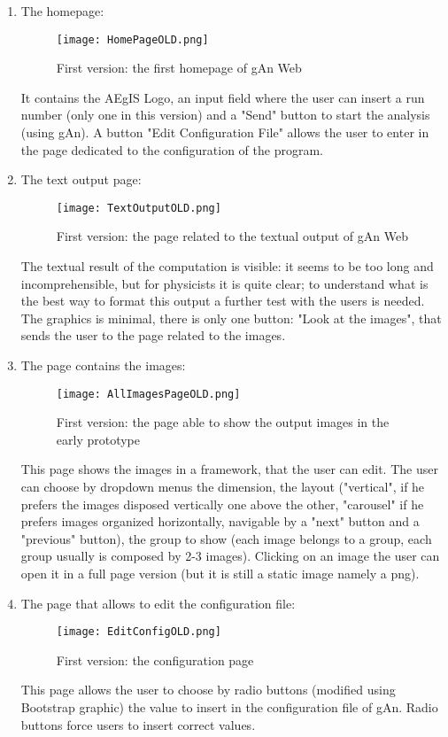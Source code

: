 \begin{enumerate}
\item The homepage:

\begin{figure}[H]
\centering
\texttt{[image: HomePageOLD.png]} 
\caption{First version: the first homepage of gAn Web}
\end{figure}

It contains the AEgIS Logo, an input field where the user can insert a run number (only one in this version) and a "Send" button to start the analysis (using gAn). A button "Edit Configuration File" allows the user to  enter in the page dedicated to the configuration of the program.

\item The text output page:

\begin{figure}[H]
\centering
\texttt{[image: TextOutputOLD.png]} 
\caption{First version: the page related to the textual output of gAn Web}
\end{figure}
  
The textual result of the computation is visible: it seems to be too long and incomprehensible, but for physicists it is quite clear; to understand what is the best way to format this output a further test with the users is needed. The graphics is minimal, there is only one button: "Look at the images", that sends the user to the page related to the images. 



\item The page contains the images:

\begin{figure}[H]
\centering
\texttt{[image: AllImagesPageOLD.png]}
\caption{First version: the page able to show the output images in the early prototype}
\end{figure}   

This page shows the images in a framework, that the user can edit.
The user can choose by dropdown menus the dimension, the layout ("vertical", if he prefers the images disposed vertically one above the other, "carousel" if he prefers images organized horizontally, navigable by a "next" button and a "previous" button), the group to show (each image belongs to a group, each group usually is composed by 2-3 images). Clicking on an image the user can open it in a full page version (but it is still a static image namely a png).


\item The page that allows to edit the configuration file:

\begin{figure}[H]
\centering
\texttt{[image: EditConfigOLD.png]}  
\caption{First version: the configuration page}
\end{figure}   

This page allows the user to choose by radio buttons (modified using Bootstrap graphic) the value to insert in the configuration file of gAn. Radio buttons force users to insert correct values.    

\end{enumerate}

